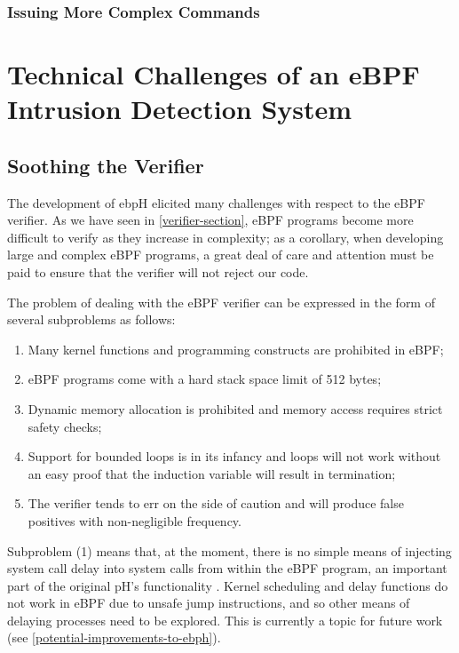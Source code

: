 \documentclass[
  12pt]{findlay}
\providecommand{\tightlist}{%
  \setlength{\itemsep}{0pt}\setlength{\parskip}{0pt}}
\begin{document}
\hypertarget{issuing-more-complex-commands}{%
\subsubsection{Issuing More Complex
Commands}\label{issuing-more-complex-commands}}

\hypertarget{technical-challenges-of-an-ebpf-intrusion-detection-system}{%
\section{Technical Challenges of an eBPF Intrusion Detection
System}\label{technical-challenges-of-an-ebpf-intrusion-detection-system}}

\hypertarget{soothing-the-verifier}{%
\subsection{Soothing the Verifier}\label{soothing-the-verifier}}

The development of ebpH elicited many challenges with respect to the
eBPF verifier. As we have seen in \autoref{verifier-section}, eBPF
programs become more difficult to verify as they increase in complexity;
as a corollary, when developing large and complex eBPF programs, a great
deal of care and attention must be paid to ensure that the verifier will
not reject our code.

The problem of dealing with the eBPF verifier can be expressed in the
form of several subproblems as follows:

\begin{enumerate}
\def\labelenumi{(\arabic{enumi})}
\tightlist
\item
  Many kernel functions and programming constructs are prohibited in
  eBPF;
\item
  eBPF programs come with a hard stack space limit of 512 bytes;
\item
  Dynamic memory allocation is prohibited and memory access requires
  strict safety checks;
\item
  Support for bounded loops is in its infancy and loops will not work
  without an easy proof that the induction variable will result in
  termination;
\item
  The verifier tends to err on the side of caution and will produce
  false positives with non-negligible frequency.
\end{enumerate}

Subproblem (1) means that, at the moment, there is no simple means of
injecting system call delay into system calls from within the eBPF
program, an important part of the original pH's functionality
\autocite{soma02}. Kernel scheduling and delay functions do not work in
eBPF due to unsafe jump instructions, and so other means of delaying
processes need to be explored. This is currently a topic for future work
(see \autoref{potential-improvements-to-ebph}).
\end{document}
